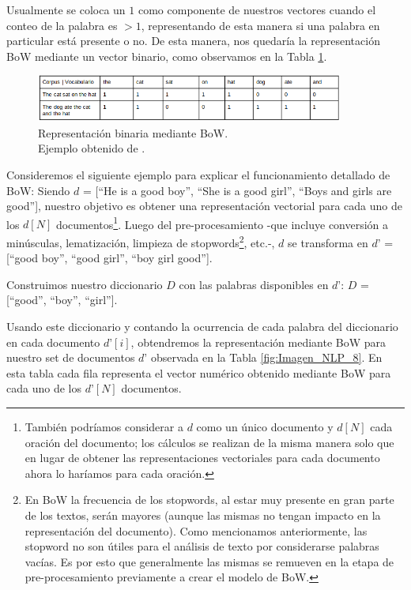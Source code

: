 \documentclass[12pt,a4paper]{article}
\begin{document}
\begin{sloppypar}
Usualmente se coloca un $1$ como componente de nuestros vectores cuando el conteo de la palabra es $>1$, representando de esta manera si una palabra en particular está presente o no. De esta manera, nos quedaría la representación BoW mediante un vector binario, como observamos en la Tabla \ref{fig:Imagen_NLP_7}.

\begin{figure}[H]    
 \centering
 \includegraphics[width=0.9\textwidth]{images/NLP/7.png}
 \caption{Representación binaria mediante BoW.\\ Ejemplo obtenido de \cite{NLP_8}.}
 \label{fig:Imagen_NLP_7}
\end{figure}

Consideremos el siguiente ejemplo para explicar el funcionamiento detallado de BoW\cite{NLP_2}: 
Siendo $d$ = [``He is a good boy'', ``She is a good girl'', ``Boys and girls are good''], nuestro objetivo es obtener una representación vectorial para cada uno de los $d[N]$ documentos\footnote{También podríamos considerar a $d$ como un único documento y $d[N]$ cada oración del documento; los cálculos se realizan de la misma manera solo que en lugar de obtener las representaciones vectoriales para cada documento ahora lo haríamos para cada oración.}.
Luego del pre-procesamiento -que incluye conversión a minúsculas, lematización, limpieza de stopwords\footnote{En BoW la frecuencia de los stopwords, al estar muy presente en gran parte de los textos, serán mayores (aunque las mismas no tengan impacto en la representación del documento). Como mencionamos anteriormente, las stopword no son útiles para el análisis de texto por considerarse palabras vacías. Es por esto que generalmente las mismas se remueven en la etapa de pre-procesamiento previamente a crear el modelo de BoW.}, etc.-, $d$ se transforma en $d’$ = [``good boy'', ``good girl'', ``boy girl good'']. 

Construimos nuestro diccionario $D$ con las palabras disponibles en $d’$: \hspace{3cm}
$D$ = [``good'', ``boy'', ``girl''].

Usando este diccionario y contando la ocurrencia de cada palabra del diccionario en cada documento $d’[i]$, obtendremos la representación mediante BoW para nuestro set de documentos $d’$ observada en la Tabla \ref{fig:Imagen_NLP_8}. En esta tabla cada fila representa el vector numérico obtenido mediante BoW para cada uno de los $d’[N]$ documentos.


\end{sloppypar}
\end{document}
